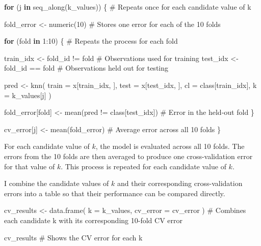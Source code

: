 \documentclass[
  letterpaper,
  DIV=11,
  numbers=noendperiod]{scrreprt}
\newenvironment{Shaded}{\begin{snugshade}}{\end{snugshade}}
\newcommand{\AttributeTok}[1]{\textcolor[rgb]{0.40,0.45,0.13}{#1}}
\newcommand{\CommentTok}[1]{\textcolor[rgb]{0.37,0.37,0.37}{#1}}
\newcommand{\ControlFlowTok}[1]{\textcolor[rgb]{0.00,0.23,0.31}{\textbf{#1}}}
\newcommand{\DecValTok}[1]{\textcolor[rgb]{0.68,0.00,0.00}{#1}}
\newcommand{\FunctionTok}[1]{\textcolor[rgb]{0.28,0.35,0.67}{#1}}
\newcommand{\NormalTok}[1]{\textcolor[rgb]{0.00,0.23,0.31}{#1}}
\newcommand{\OtherTok}[1]{\textcolor[rgb]{0.00,0.23,0.31}{#1}}
\newcommand{\SpecialCharTok}[1]{\textcolor[rgb]{0.37,0.37,0.37}{#1}}
\begin{document}
\begin{Shaded}
\begin{Highlighting}[]
\ControlFlowTok{for}\NormalTok{ (j }\ControlFlowTok{in} \FunctionTok{seq\_along}\NormalTok{(k\_values)) \{ }\CommentTok{\# Repeats once for each candidate value of k}
  
\NormalTok{  fold\_error }\OtherTok{\textless{}{-}} \FunctionTok{numeric}\NormalTok{(}\DecValTok{10}\NormalTok{) }\CommentTok{\# Stores one error for each of the 10 folds}
  
  \ControlFlowTok{for}\NormalTok{ (fold }\ControlFlowTok{in} \DecValTok{1}\SpecialCharTok{:}\DecValTok{10}\NormalTok{) \{ }\CommentTok{\# Repeats the process for each fold}
    
\NormalTok{    train\_idx }\OtherTok{\textless{}{-}}\NormalTok{ fold\_id }\SpecialCharTok{!=}\NormalTok{ fold }\CommentTok{\# Observations used for training}
\NormalTok{    test\_idx  }\OtherTok{\textless{}{-}}\NormalTok{ fold\_id }\SpecialCharTok{==}\NormalTok{ fold }\CommentTok{\# Observations held out for testing}
    
\NormalTok{    pred }\OtherTok{\textless{}{-}} \FunctionTok{knn}\NormalTok{(}
      \AttributeTok{train =}\NormalTok{ x[train\_idx, ],}
      \AttributeTok{test =}\NormalTok{ x[test\_idx, ],}
      \AttributeTok{cl =}\NormalTok{ class[train\_idx],}
      \AttributeTok{k =}\NormalTok{ k\_values[j]}
\NormalTok{    )}
    
\NormalTok{    fold\_error[fold] }\OtherTok{\textless{}{-}} \FunctionTok{mean}\NormalTok{(pred }\SpecialCharTok{!=}\NormalTok{ class[test\_idx]) }\CommentTok{\# Error in the held{-}out fold}
\NormalTok{  \}}
  
\NormalTok{  cv\_error[j] }\OtherTok{\textless{}{-}} \FunctionTok{mean}\NormalTok{(fold\_error) }\CommentTok{\# Average error across all 10 folds}
\NormalTok{\}}
\end{Highlighting}
\end{Shaded}

For each candidate value of \(k\), the model is evaluated across all 10
folds. The errors from the 10 folds are then averaged to produce one
cross-validation error for that value of \(k\). This process is repeated
for each candidate value of \(k\).

I combine the candidate values of \(k\) and their corresponding
cross-validation errors into a table so that their performance can be
compared directly.

\begin{Shaded}
\begin{Highlighting}[]
\NormalTok{cv\_results }\OtherTok{\textless{}{-}} \FunctionTok{data.frame}\NormalTok{(}
  \AttributeTok{k =}\NormalTok{ k\_values,}
  \AttributeTok{cv\_error =}\NormalTok{ cv\_error}
\NormalTok{) }\CommentTok{\# Combines each candidate k with its corresponding 10{-}fold CV error}

\NormalTok{cv\_results }\CommentTok{\# Shows the CV error for each k}
\end{Highlighting}
\end{Shaded}
\end{document}

